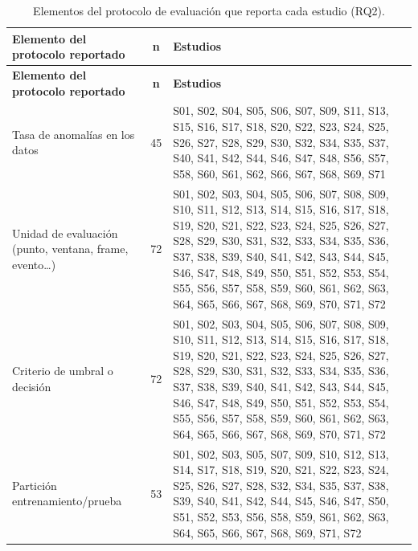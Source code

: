 \begingroup
\small
\begin{xltabular}{\linewidth}{lcX}
\caption{Elementos del protocolo de evaluaci\'{o}n que reporta cada estudio (RQ2).}\label{tab:protocolo}\\
\toprule
\textbf{Elemento del protocolo reportado} & \textbf{n} & \textbf{Estudios} \\
\midrule\endfirsthead
\toprule
\textbf{Elemento del protocolo reportado} & \textbf{n} & \textbf{Estudios} \\
\midrule\endhead
\bottomrule\endfoot
Tasa de anomal\'{i}as en los datos & 45 & S01, S02, S04, S05, S06, S07, S09, S11, S13, S15, S16, S17, S18, S20, S22, S23, S24, S25, S26, S27, S28, S29, S30, S32, S34, S35, S37, S40, S41, S42, S44, S46, S47, S48, S56, S57, S58, S60, S61, S62, S66, S67, S68, S69, S71 \\
Unidad de evaluaci\'{o}n (punto, ventana, frame, evento\ldots) & 72 & S01, S02, S03, S04, S05, S06, S07, S08, S09, S10, S11, S12, S13, S14, S15, S16, S17, S18, S19, S20, S21, S22, S23, S24, S25, S26, S27, S28, S29, S30, S31, S32, S33, S34, S35, S36, S37, S38, S39, S40, S41, S42, S43, S44, S45, S46, S47, S48, S49, S50, S51, S52, S53, S54, S55, S56, S57, S58, S59, S60, S61, S62, S63, S64, S65, S66, S67, S68, S69, S70, S71, S72 \\
Criterio de umbral o decisi\'{o}n & 72 & S01, S02, S03, S04, S05, S06, S07, S08, S09, S10, S11, S12, S13, S14, S15, S16, S17, S18, S19, S20, S21, S22, S23, S24, S25, S26, S27, S28, S29, S30, S31, S32, S33, S34, S35, S36, S37, S38, S39, S40, S41, S42, S43, S44, S45, S46, S47, S48, S49, S50, S51, S52, S53, S54, S55, S56, S57, S58, S59, S60, S61, S62, S63, S64, S65, S66, S67, S68, S69, S70, S71, S72 \\
Partici\'{o}n entrenamiento/prueba & 53 & S01, S02, S03, S05, S07, S09, S10, S12, S13, S14, S17, S18, S19, S20, S21, S22, S23, S24, S25, S26, S27, S28, S32, S34, S35, S37, S38, S39, S40, S41, S42, S44, S45, S46, S47, S50, S51, S52, S53, S56, S58, S59, S61, S62, S63, S64, S65, S66, S67, S68, S69, S71, S72 \\
\end{xltabular}
\endgroup
